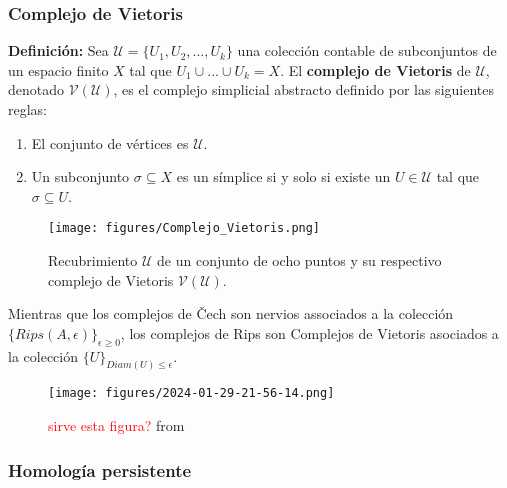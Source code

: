 \documentclass[a4paper,11pt]{article}
\newcommand{\red}[1]{\textcolor{red}{#1}}
\begin{document}
\subsubsection*{Complejo de Vietoris}
\textbf{Definición:} Sea $\mathcal{U}=\{U_{1}, U_{2}, ... ,U_{k}\}$ una colección contable de subconjuntos de un espacio finito $X$ tal que $U_{1}\cup ... \cup U_{k}=X$. El \textbf{complejo de Vietoris} de $\mathcal{U}$, denotado \textbf{$\mathcal{V}(\mathcal{U})$}, es el complejo simplicial abstracto definido por las siguientes reglas:
\begin{enumerate}
    \item El conjunto de vértices es $\mathcal{U}$.
    \item Un subconjunto $\sigma \subseteq X$ es un símplice si y solo si existe un $U \in \mathcal{U}$ tal que $\sigma \subseteq U$.
\end{enumerate}
\begin{figure}[!htb]
  \centering
  \texttt{[image: figures/Complejo\_Vietoris.png]}
  \caption{Recubrimiento $\mathcal{U}$ de un conjunto de ocho puntos y su respectivo complejo de Vietoris $\mathcal{V}(\mathcal{U})$.}
\end{figure}
Mientras que los complejos de Čech son nervios associados a la colección $\{Rips(A,\epsilon)\}_{\epsilon \geq 0}$, los complejos de Rips son Complejos de Vietoris asociados a la colección $\{U\}_{Diam(U)\leq \epsilon}$.


\begin{figure}[!htb]
    \centering
    \texttt{[image: figures/2024-01-29-21-56-14.png]}
    \caption{\red{sirve esta figura?} from \cite{ghrist08}}%
\end{figure}



\subsubsection{Homología persistente}

\end{document}
